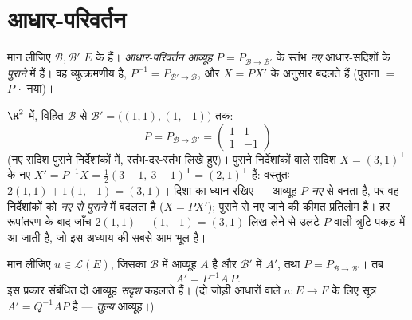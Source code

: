 \section{आधार-परिवर्तन}

\begin{definition}\label{def:b1:matrices:changeofbasis}
मान लीजिए $\mathcal{B}, \mathcal{B}'$ $E$ के  हैं। \emph{आधार-परिवर्तन
आव्यूह} $P = P_{\mathcal{B}\to\mathcal{B}'}$ के स्तंभ
\emph{नए} आधार-सदिशों के \emph{पुराने}  में  हैं। वह
व्युत्क्रमणीय है, $P^{-1} = P_{\mathcal{B}'\to\mathcal{B}}$, और 
$X = PX'$ के अनुसार बदलते हैं (पुराना $=$ $P\,\cdot$ नया)।
\end{definition}

\begin{example}[आधार-परिवर्तन आव्यूह पढ़ना]
\label{ex:b1:matrices:changerun}
$\R^2$ में, विहित $\mathcal B$ से $\mathcal B' = \bigl((1,1), (1,-1)\bigr)$
तक:
\[
P = P_{\mathcal B\to\mathcal B'} =
\begin{pmatrix} 1 & 1\\ 1 & -1 \end{pmatrix}
\]
(नए सदिश पुराने निर्देशांकों में, स्तंभ-दर-स्तंभ लिखे हुए)। पुराने
निर्देशांकों वाले सदिश $X = (3, 1)^{\mathsf T}$ के नए  $X' =
P^{-1}X = \frac12(3 + 1,\ 3 - 1)^{\mathsf T} = (2, 1)^{\mathsf T}$ हैं:
वस्तुतः $2(1,1) + 1(1,-1) = (3,1)$। दिशा का ध्यान रखिए --- आव्यूह $P$
\emph{नए}  से बनता है, पर वह निर्देशांकों को \emph{नए से पुराने} में
बदलता है ($X = PX'$); पुराने से नए जाने की क़ीमत प्रतिलोम है। हर रूपांतरण के
बाद जाँच $2(1,1) + (1,-1) = (3,1)$ लिख लेने से उलटे-$P$ वाली त्रुटि पकड़ में
आ जाती है, जो इस अध्याय की सबसे आम भूल है।
\end{example}

\begin{theorem}[किसी प्रतिचित्रण के लिए आधार-परिवर्तन]\label{thm:b1:matrices:conjugation}
मान लीजिए $u \in \mathcal{L}(E)$, जिसका $\mathcal{B}$ में आव्यूह $A$ है और
$\mathcal{B}'$ में $A'$, तथा $P = P_{\mathcal{B}\to\mathcal{B}'}$। तब
\[
A' = P^{-1} A\, P .
\]
इस प्रकार संबंधित दो आव्यूह \emph{सदृश} कहलाते हैं। (दो
जोड़ी आधारों वाले $u \colon E \to F$ के लिए सूत्र $A' = Q^{-1} A P$ है ---
\emph{तुल्य} आव्यूह।)
\end{theorem}

